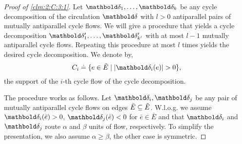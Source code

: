 \documentclass{tufte-handout}
\newcommand{\Etil}{\Tilde{E}}
\begin{document}
\begin{proof}[Proof of \cref{clm:2:C:3:1}]
Let $\vdelta_1, \dots, \vdelta_k$ be any cycle decomposition of the circulation $\vdelta$ with $l > 0$ antiparallel pairs of mutually antiparallel cycle flows. We will give a procedure that yields a cycle decomposition $\vdelta_1', \dots, \vdelta_{k'}'$ with at most $l - 1$ mutually antiparallel cycle flows. Repeating this procedure at most $l$ times yields the desired cycle decomposition. We denote by, \begin{align*}
    C_i \defeq \{e \in \Etil \mid |\vdelta_i(e)| > 0\},
\end{align*} the support of the $i$-th cycle flow of the cycle decomposition.

The procedure works as follows. Let $\vdelta_i,\vdelta_j$ be any pair of mutually antiparallel cycle flows on edges $\bar{E} \subseteq \Etil$. W.l.o.g. we assume $\vdelta_i(\bar{e}) > 0$, $\vdelta_j(\bar{e}) < 0$ for $\bar{e} \in \bar{E}$ and that $\vdelta_i$ and $\vdelta_j$ route $\alpha$ and $\beta$ units of flow, respectively. To simplify the presentation, we also assume $\alpha \geq \beta$, the other case is symmetric.


\end{proof}
\end{document}
